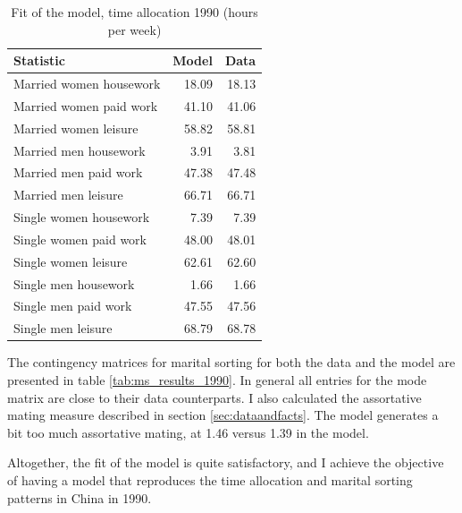 \documentclass[12pt]{article}
\begin{document}
\begin{table}[htbp]
	\centering
	\caption{Fit of the model, time allocation 1990 (hours per week)}
	\begin{tabular}{lrr}
		\toprule
		Statistic & \multicolumn{1}{l}{Model} & \multicolumn{1}{l}{Data} \\
		\midrule
		Married women housework & 18.09 & 18.13 \\
		Married women paid work & 41.10 & 41.06 \\
		Married women leisure & 58.82 & 58.81 \\
		Married men housework & 3.91  & 3.81 \\
		Married men paid work & 47.38 & 47.48 \\
		Married men leisure & 66.71 & 66.71 \\
		Single women housework & 7.39  & 7.39 \\
		Single women paid work & 48.00 & 48.01 \\
		Single women leisure & 62.61 & 62.60 \\
		Single men housework & 1.66  & 1.66 \\
		Single men paid work & 47.55 & 47.56 \\
		Single men leisure & 68.79 & 68.78 \\
		\bottomrule
		\bottomrule
	\end{tabular}
	\label{tab:ta_results_1990}
\end{table}

The contingency matrices for marital sorting for both the data and the model are presented in table \ref{tab:ms_results_1990}. In general all entries for the mode matrix are close to their data counterparts. I also calculated the assortative mating measure described in section \ref{sec:dataandfacts}. The model generates a bit too much assortative mating, at 1.46 versus 1.39 in the model.   

Altogether, the fit of the model is quite satisfactory, and I achieve the objective of having a model that reproduces the time allocation and marital sorting patterns in China in 1990.
\end{document}
